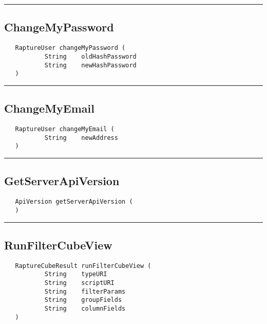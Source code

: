 \rule{15cm}{2pt}
\subsection{ChangeMyPassword}
\label{Api:ChangeMyPassword}
\begin{verbatim}
   RaptureUser changeMyPassword (
           String    oldHashPassword
           String    newHashPassword
   )
\end{verbatim}



\rule{15cm}{2pt}
\subsection{ChangeMyEmail}
\label{Api:ChangeMyEmail}
\begin{verbatim}
   RaptureUser changeMyEmail (
           String    newAddress
   )
\end{verbatim}



\rule{15cm}{2pt}
\subsection{GetServerApiVersion}
\label{Api:GetServerApiVersion}
\begin{verbatim}
   ApiVersion getServerApiVersion (
   )
\end{verbatim}



\rule{15cm}{2pt}
\subsection{RunFilterCubeView}
\label{Api:RunFilterCubeView}
\begin{verbatim}
   RaptureCubeResult runFilterCubeView (
           String    typeURI
           String    scriptURI
           String    filterParams
           String    groupFields
           String    columnFields
   )
\end{verbatim}



